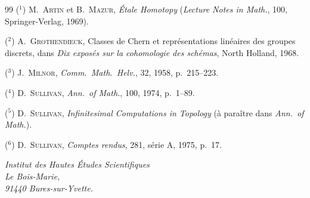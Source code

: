 \documentclass[10pt]{amsart}
\theoremstyle{plain}
\theoremstyle{remark}
\begin{document}
\smallskip

\begin{thebibliography}{99}
\bibitem{}
($^1$) M.\ \textsc{Artin} et B.\ \textsc{Mazur}, \textit{\'Etale Homotopy} (\textit{Lecture Notes in Math.}, 100, Springer-Verlag, 1969).

\bibitem{}
($^2$) A.\ \textsc{Grothendieck}, Classes de Chern et repr\'{e}sentations lin\'{e}aires des groupes discrets, dans \textit{Dix expos\'{e}s sur la cohomologie des sch\'{e}mas}, North Holland, 1968.

\bibitem{}
($^3$) J.\ \textsc{Milnor}, \textit{Comm.\ Math.\ Helv.}, 32, 1958, p.~215--223.

\bibitem{}
($^4$) D.\ \textsc{Sullivan}, \textit{Ann.\ of Math.}, 100, 1974, p.~1--89.

\bibitem{}
($^5$) D.\ \textsc{Sullivan}, \textit{Infinitesimal Computations in Topology} (\`{a} para\^{i}tre dans \textit{Ann.\ of Math.}).

\bibitem{}
($^6$) D.\ \textsc{Sullivan}, \textit{Comptes rendus}, 281, s\'{e}rie A, 1975, p.~17.
\end{thebibliography}

\vfill

\begin{flushright}
\textit{Institut des Hautes \'{E}tudes Scientifiques}\\
\textit{Le Bois-Marie,}\\
\textit{91440 Bures-sur-Yvette.}
\end{flushright}
\end{document}

